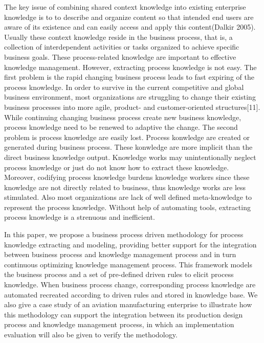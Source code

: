 \documentclass[doublespacing]{elsarticle}
\begin{document}
The key issue of combining shared context knowledge into existing
enterprise knowledge is to  to describe and organize
content so that intended end users are aware of its existence and can
easily access and apply this content(Dalkir 2005). Usually these
context knowledge reside in the business process, that is,  a collection of
interdependent activities or tasks organized to achieve specific
business goals. These process-related knowledge are important to
effective knowledge management. However, extracting
process knowledge is not easy. The first problem is the rapid changing
business process leads to fast expiring of the process knowledge. In order to survive in the current
competitive and global business environment, most organizations are
struggling to change their existing business processes into more agile,
product- and customer-oriented structures[11]. While continuing changing
business process create new business knowledge, process knowledge need
to be renewed to adaptive the change. The second problem is process
knowledge are easily lost. Process konwledge are created or generated
during business process. These konwledge are more  implicit than the
direct business knowledge output. Knowledge works may unintentionally
neglect process knowledge or just do not know how to extract these
knowledge. Moreover, codifying process knowledge burdens knowledge
workers since these knowledge are not directly related to business,
thus knowledge works are less stimulated.  Also most organizations are lack of
well defined meta-knowledge to represent the process
knowledge. Without help of automating tools, extracting process
knowledge is a strenuous and  inefficient.

In this paper, we propose a business process driven methodology
for  process knowledge extracting and modeling, providing better support for
the integration between business process and knowledge management
process and in turn continuous optimizing knowledge management
process. This framework models the business process and a set of
pre-defined driven rules to elicit process knowledge. When business
process change, corresponding process knowledge are automated
recreated according to driven rules and stored in knowledge base. 
 We also
give a case study of an aviation manufacturing enterprise to illustrate
how this methodology can support the integration between its
production design process and knowledge management process, in which an
implementation evaluation will also be given to verify the
methodology.
\end{document}
